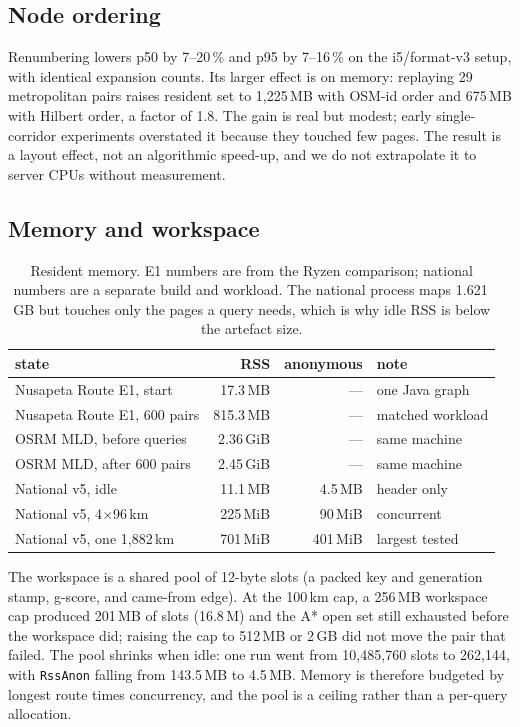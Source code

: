 \documentclass[sigconf,nonacm]{acmart}
\begin{document}
\subsection{Node ordering}
Renumbering lowers p50 by 7--20\,\% and p95 by 7--16\,\% on the i5/format-v3
setup, with identical expansion counts. Its larger effect is on memory: replaying
29 metropolitan pairs raises resident set to 1{,}225\,MB with OSM-id order and
675\,MB with Hilbert order, a factor of 1.8. The gain is real but modest; early
single-corridor experiments overstated it because they touched few pages. The
result is a layout effect, not an algorithmic speed-up, and we do not extrapolate
it to server CPUs without measurement.

\subsection{Memory and workspace}
\begin{table}[t]
\footnotesize
\begin{tabular}{@{}lrrl@{}}
\toprule
state & RSS & anonymous & note \\
\midrule
Nusapeta Route E1, start        &  17.3\,MB & --- & one Java graph \\
Nusapeta Route E1, 600 pairs    & 815.3\,MB & --- & matched workload \\
OSRM MLD, before queries &  2.36\,GiB & --- & same machine \\
OSRM MLD, after 600 pairs & 2.45\,GiB & --- & same machine \\
National v5, idle        &  11.1\,MB & 4.5\,MB & header only \\
National v5, 4$\times$96\,km & 225\,MiB & 90\,MiB & concurrent \\
National v5, one 1{,}882\,km & 701\,MiB & 401\,MiB & largest tested \\
\bottomrule
\end{tabular}
\caption{Resident memory. E1 numbers are from the Ryzen comparison; national
numbers are a separate build and workload. The national process maps 1.621\,GB
but touches only the pages a query needs, which is why idle RSS is below the
artefact size.}
\label{tab:memory}
\end{table}

The workspace is a shared pool of 12-byte slots (a packed key and generation
stamp, g-score, and came-from edge). At the 100\,km cap, a 256\,MB workspace cap produced 201\,MB of slots
(16.8\,M) and the A* open set still exhausted before the workspace did; raising
the cap to 512\,MB or 2\,GB did not move the pair that failed. The pool shrinks
when idle: one run went from 10{,}485{,}760 slots to 262{,}144, with
\texttt{RssAnon} falling from 143.5\,MB to 4.5\,MB. Memory is therefore budgeted
by longest route times concurrency, and the pool is a ceiling rather than a
per-query allocation.
\end{document}
